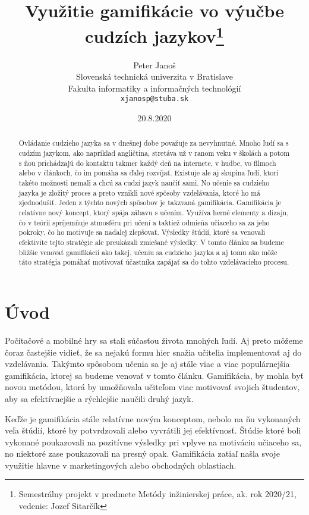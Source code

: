 \documentclass[10pt,oneside,slovak,a4paper]{article}
\title{Využitie gamifikácie vo výučbe cudzích jazykov\thanks{Semestrálny projekt v predmete Metódy inžinierskej práce, ak. rok 2020/21, vedenie: Jozef Sitarčík}} %
\author{Peter Janoš\\[2pt]
	{\small Slovenská technická univerzita v Bratislave}\\
	{\small Fakulta informatiky a informačných technológií}\\
	{\small \texttt{xjanosp@stuba.sk}}
	}
\date{\small 20.8.2020} %
\begin{document}
\maketitle

\begin{abstract}
Ovládanie cudzieho jazyka sa v dnešnej dobe považuje za nevyhnutné. Mnoho ľudí sa s cudzím jazykom, ako napríklad angličtina, stretáva už v ranom veku v školách a potom s ňou prichádzajú do kontaktu takmer každý deň na internete, v hudbe, vo filmoch alebo v článkoch, čo im pomáha sa ďalej rozvíjať. Existuje ale aj skupina ľudí, ktorí takéto možnosti nemali a chcú sa cudzí jazyk naučiť sami. No učenie sa cudzieho jazyka je zložitý proces a preto vznikli nové spôsoby vzdelávania, ktoré ho má zjednodušiť. Jeden z týchto nových spôsobov je takzvaná gamifikácia. Gamifikácia je relatívne nový koncept, ktorý spája zábavu s učením. Využíva herné elementy a dizajn, čo v teórii spríjemňuje atmosféru pri učení a taktiež odmieňa učiaceho sa za jeho pokroky, čo ho motivuje sa naďalej zlepšovať. Výsledky štúdií, ktoré sa venovali efektivite tejto stratégie ale preukázali zmiešané výsledky. V tomto článku sa budeme bližšie venovať gamifikácií ako takej, učeniu sa cudzieho jazyka a aj tomu ako môže táto stratégia pomáhať motivovať účastníka zapájať sa do tohto vzdelávacieho procesu.
\end{abstract}



\section{Úvod} \label{uvod}

Počítačové a mobilné hry sa stali súčasťou života mnohých ľudí. Aj preto môžeme čoraz častejšie vidieť, že sa nejakú formu hier snažia učitelia implementovať aj do vzdelávania. Takýmto spôsobom učenia sa je aj stále viac a viac populárnejšia gamifikácia, ktorej sa budeme venovať v tomto článku. Gamifikácia, by mohla byť novou metódou, ktorá by umožňovala učiteľom viac motivovať svojich študentov, aby sa efektívnejšie a rýchlejšie naučili druhý jazyk. 

Keďže je gamifikácia stále relatívne novým konceptom, nebolo na ňu vykonaných veľa štúdií, ktoré by potvrdzovali alebo vyvrátili jej efektívnosť. Štúdie ktoré boli vykonané poukazovali na pozitívne výsledky pri vplyve na motiváciu učiaceho sa, no niektoré zase poukazovali na presný opak. Gamifikácia zatiaľ našla svoje využitie hlavne v marketingových alebo obchodných oblastiach. ~\cite{garland2015gamification}
\end{document}
